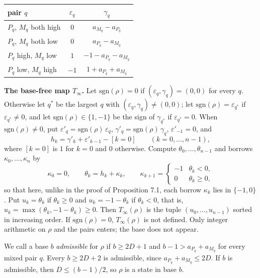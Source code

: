 \documentclass[11pt,letterpaper]{article}
\theoremstyle{paperstyle}
\theoremstyle{paperstyledef}
\theoremstyle{paperstylerem}
\begin{document}
{\def\LTcaptype{none} %
\begin{longtable}[]{@{}lcc@{}}
\toprule\noalign{}
pair \(q\) & \(\varepsilon_q\) & \(\gamma_q\) \\
\midrule\noalign{}
\endhead
\bottomrule\noalign{}
\endlastfoot
\(P_q\), \(M_q\) both high & \(0\) & \(a_{M_q} - a_{P_q}\) \\
\(P_q\), \(M_q\) both low & \(0\) & \(a_{P_q} - a_{M_q}\) \\
\(P_q\) high, \(M_q\) low & \(1\) & \(-1 - a_{P_q} - a_{M_q}\) \\
\(P_q\) low, \(M_q\) high & \(-1\) & \(1 + a_{P_q} + a_{M_q}\) \\
\end{longtable}
}

\textbf{The base-free map \(T_\infty\).} Let \(\mathrm{sgn}(\rho) = 0\) if \((\varepsilon_q, \gamma_q) = (0, 0)\) for every \(q\). Otherwise let \(q^*\) be the largest \(q\) with \((\varepsilon_q, \gamma_q) \ne (0,0)\); let \(\mathrm{sgn}(\rho) = \varepsilon_{q^*}\) if \(\varepsilon_{q^*} \ne 0\), and let \(\mathrm{sgn}(\rho) \in \{1, -1\}\) be the sign of \(\gamma_{q^*}\) if \(\varepsilon_{q^*} = 0\). When \(\mathrm{sgn}(\rho) \ne 0\), put \(\varepsilon'_q = \mathrm{sgn}(\rho)\, \varepsilon_q\), \(\gamma'_q = \mathrm{sgn}(\rho)\, \gamma_q\), \(\varepsilon'_{-1} = 0\), and \[h_k = \gamma'_k + \varepsilon'_{k-1} - [k = 0] \qquad (k = 0, \dots, n-1),\] where \([k=0]\) is \(1\) for \(k = 0\) and \(0\) otherwise. Compute \(\theta_0, \dots, \theta_{n-1}\) and borrows \(\kappa_0, \dots, \kappa_n\) by \[\kappa_0 = 0, \qquad \theta_k = h_k + \kappa_k, \qquad \kappa_{k+1} = \begin{cases} -1 & \theta_k < 0, \\ 0 & \theta_k \ge 0, \end{cases}\] so that here, unlike in the proof of Proposition 7.1, each borrow \(\kappa_k\) lies in \(\{-1, 0\}\). Put \(u_k = \theta_k\) if \(\theta_k \ge 0\) and \(u_k = -1 - \theta_k\) if \(\theta_k < 0\), that is, \(u_k = \max(\theta_k, -1-\theta_k) \ge 0\). Then \(T_\infty(\rho)\) is the tuple \((u_0, \dots, u_{n-1})\) sorted in increasing order. If \(\mathrm{sgn}(\rho) = 0\), \(T_\infty(\rho)\) is not defined. Only integer arithmetic on \(\rho\) and the pairs enters; the base does not appear.

We call a base \(b\) \emph{admissible} for \(\rho\) if \(b \ge 2D+1\) and \(b - 1 > a_{P_q} + a_{M_q}\) for every mixed pair \(q\). Every \(b \ge 2D + 2\) is admissible, since \(a_{P_q} + a_{M_q} \le 2D\). If \(b\) is admissible, then \(D \le (b-1)/2\), so \(\rho\) is a state in base \(b\).
\end{document}
